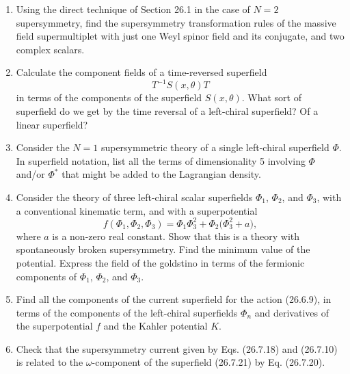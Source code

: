 

\begin{enumerate}
  \item Using the direct technique of Section 26.1 in the case of $N=2$
  supersymmetry, find the supersymmetry transformation rules of the
  massive field supermultiplet with just one Weyl spinor field and its
  conjugate, and two complex scalars.

  \item Calculate the component fields of a time-reversed superfield
  \[
    T^{-1}S(x,\theta)T
  \]
  in terms of the components of the superfield $S(x,\theta)$. What sort
  of superfield do we get by the time reversal of a left-chiral
  superfield? Of a linear superfield?

  \item Consider the $N=1$ supersymmetric theory of a single left-chiral
  superfield $\Phi$. In superfield notation, list all the terms of
  dimensionality 5 involving $\Phi$ and/or $\Phi^*$ that might be added
  to the Lagrangian density.

  \item Consider the theory of three left-chiral scalar superfields
  $\Phi_1$, $\Phi_2$, and $\Phi_3$, with a conventional kinematic term,
  and with a superpotential
  \[
    f(\Phi_1,\Phi_2,\Phi_3)
    = \Phi_1\Phi_3^2+\Phi_2\bigl(\Phi_3^2+a\bigr),
  \]
  where $a$ is a non-zero real constant. Show that this is a theory with
  spontaneously broken supersymmetry. Find the minimum value of the
  potential. Express the field of the goldstino in terms of the
  fermionic components of $\Phi_1$, $\Phi_2$, and $\Phi_3$.

  \item Find all the components of the current superfield for the action
  (26.6.9), in terms of the components of the left-chiral superfields
  $\Phi_n$ and derivatives of the superpotential $f$ and the Kahler
  potential $K$.

  \item Check that the supersymmetry current given by Eqs. (26.7.18) and
  (26.7.10) is related to the $\omega$-component of the superfield
  (26.7.21) by Eq. (26.7.20).
\end{enumerate}


